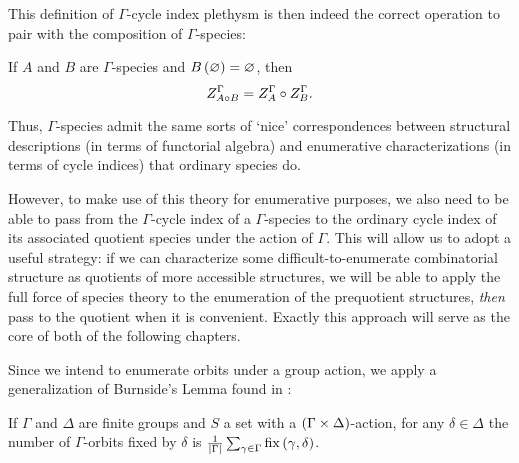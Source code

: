 \documentclass[sectionflow,singlespace,twoside,boldmathhdr,draft]{brandiss} %
\numberwithin{section}{chapter}
\numberwithin{figure}{chapter}
\begin{document}
This definition of $\Gamma$-cycle index plethysm is then indeed the correct operation to pair with the composition of $\Gamma$-species:
\begin{theorem}
  \label{thm:gspeccompci}
  If $A$ and $B$ are $\Gamma$-species and $B \left( {\varnothing} \right) = \varnothing$, then
  \begin{equation}
    \label{eq:gspeccompci}
     Z_{A \circ B}^{{\Gamma} {}}  =  Z_{A}^{{\Gamma} {}}  \circ  Z_{B}^{{\Gamma} {}} .
  \end{equation}
\end{theorem}
Thus, $\Gamma$-species admit the same sorts of `nice' correspondences between structural descriptions (in terms of functorial algebra) and enumerative characterizations (in terms of cycle indices) that ordinary species do.

However, to make use of this theory for enumerative purposes, we also need to be able to pass from the $\Gamma$-cycle index of a $\Gamma$-species to the ordinary cycle index of its associated quotient species under the action of $\Gamma$.
This will allow us to adopt a useful strategy: if we can characterize some difficult-to-enumerate combinatorial structure as quotients of more accessible structures, we will be able to apply the full force of species theory to the enumeration of the prequotient structures, \emph{then} pass to the quotient when it is convenient.
Exactly this approach will serve as the core of both of the following chapters.

Since we intend to enumerate orbits under a group action, we apply a generalization of Burnside's Lemma found in \cite[Lemma 5]{gessel:laginvspec}:
\begin{lemma}
  \label{lem:grouporbits}
  If $\Gamma$ and $\Delta$ are finite groups and $S$ a set with a $\left( {\Gamma \times \Delta} \right)$-action, for any $\delta \in \Delta$ the number of $\Gamma$-orbits fixed by $\delta$ is $\frac{1}{\left\vert {\Gamma} \right\vert} \sum_{\gamma \in \Gamma} \operatorname{fix} \left( {\gamma, \delta} \right)$.
\end{lemma}
\end{document}
